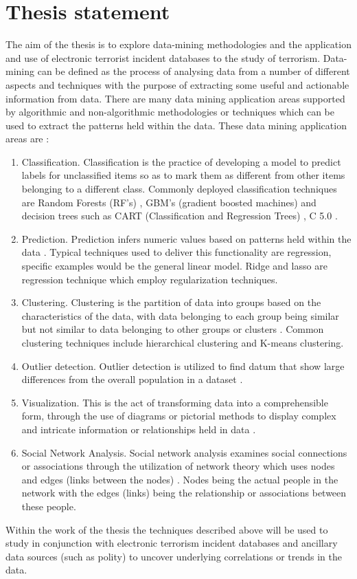 \documentclass[11pt,twocolumn]{article}
\begin{document}
\section*{\textbf{Thesis statement}}
The aim of the thesis is to explore data-mining methodologies and the application and use of electronic terrorist incident databases to the study of terrorism. Data-mining can be defined as the process of analysing data from a number of different aspects and techniques with the purpose of extracting some useful and actionable information from data. There are many data mining application areas supported by algorithmic and non-algorithmic methodologies or techniques which can be used to extract the patterns held within the data. These data mining application areas are \citep{myatt2007making}:
\begin{enumerate}
\item Classification. Classification is the practice of developing a model to predict labels for unclassified items so as to mark them as different from other items belonging to a different class. Commonly deployed classification techniques are Random Forests (RF’s) \citep{breiman2001random}, GBM’s (gradient boosted machines) \citep{friedman2001greedy} and decision trees such as CART (Classification and Regression Trees) , C 5.0 \citep{steinberg2009cart}. 
\item Prediction. Prediction infers numeric values based on patterns held within the data \citep{ledolter2013data}. Typical techniques used to deliver this functionality are regression, specific examples would be the general linear model. Ridge and lasso are regression technique which employ regularization techniques. 
\item Clustering. Clustering is the partition of data into groups based on the characteristics of the data, with data belonging to each group being similar but not similar to data belonging to other groups or clusters \citep{jain2010data}. Common clustering techniques include hierarchical clustering and K-means clustering.
\item Outlier detection. Outlier detection is utilized to find datum that show large differences from the overall population in a dataset \citep{hodge2004survey}.
\item Visualization. This is the act of transforming data into a comprehensible form, through the use of diagrams or pictorial methods to display complex and intricate information or relationships held in data \citep{tufte2006beautiful}. 
\item Social Network Analysis. Social network analysis examines social connections or associations through the utilization of network theory which uses nodes and edges (links between the nodes) \citep{scott2011social}. Nodes being the actual people in the network with the edges (links) being the relationship or associations between these people.
\end{enumerate}
Within the work of the thesis the techniques described above will be used to study in conjunction with electronic terrorism incident databases and ancillary data sources (such as polity) to uncover underlying correlations or trends in the data.      
\end{document}
